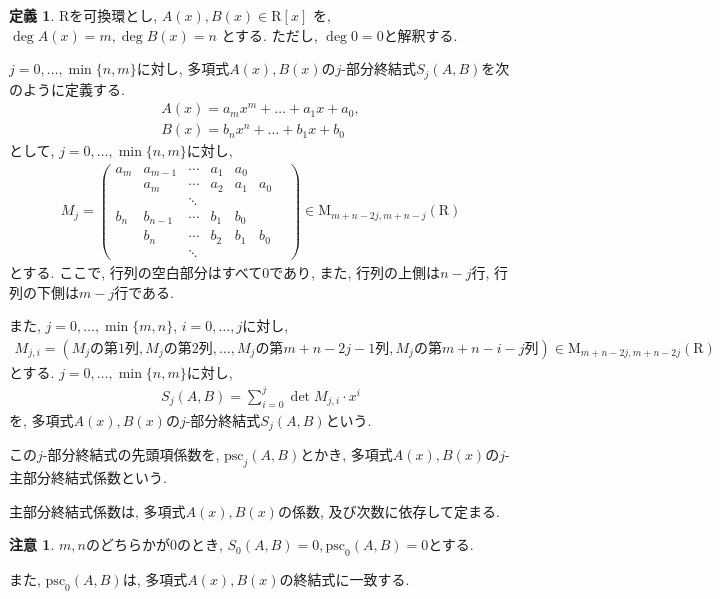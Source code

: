 \documentclass[dvipdfmx,uplatex]{jsarticle}
\newcommand{\psc}{\mathrm{psc}}
\theoremstyle{definition}
\newtheorem{definition}{定義}[section]
\newtheorem{remark}{注意}[section]
\begin{document}
\begin{definition}
$\mathrm{R}$を可換環とし, $A(x), B(x) \in \mathrm{R}[x]$ を, $\deg A(x) = m, \deg B(x) = n$ とする. ただし, $\deg 0 = 0$と解釈する.

$j = 0, \dots, \min\{n, m\}$に対し, 多項式$A(x), B(x)$の$j$-部分終結式$S_j(A, B)$を次のように定義する.
\begin{align*}
A(x) = a_m x^m + \dots + a_1 x + a_0, \\
B(x) = b_n x^n + \dots + b_1 x + b_0 
\end{align*}
として, $j = 0, \dots, \min\{n,m\}$に対し, 
\begin{align*}
M_j = 
\begin{pmatrix}
a_m & a_{m-1} & \cdots & a_1 & a_0 &    &  \\
     &  a_m     & \cdots & a_2 & a_1& a_0 &  \\
     &   & \ddots &  & & \\
b_n & b_{n-1} & \cdots & b_1 & b_0 &    & \\
     &  b_n     & \cdots & b_2 & b_1& b_0 & \\
     &   & \ddots &  & & 
\end{pmatrix}
\in \mathrm{M}_{m+n-2j, m+n-j}(\mathrm{R})
\end{align*}
とする. ここで, 行列の空白部分はすべて0であり, また, 行列の上側は$n-j$行, 行列の下側は$m-j$行である.

また, $j = 0, \dots, \min\{m,n\}$, $i = 0, \dots, j$に対し, 
\begin{align*}
M_{j,i} = (\text{$M_j$の第$1$列}, \text{$M_j$の第$2$列}, \dots ,\text{$M_j$の第$m+n-2j-1$列}, \text{$M_j$の第$m+n-i-j$列})
\in \mathrm{M}_{m+n-2j, m+n-2j}(\mathrm{R})
\end{align*}
とする. $j = 0, \dots, \min\{n, m\}$に対し, 
\begin{align*}
S_j(A, B) = \sum_{i=0}^j \det M_{j, i} \cdot x^i 
\end{align*}
を, 多項式$A(x), B(x)$の$j$-部分終結式$S_j(A, B)$という.

この$j$-部分終結式の先頭項係数を, $\psc_j(A,B)$とかき, 多項式$A(x), B(x)$の$j$-主部分終結式係数という.
\end{definition}


主部分終結式係数は, 多項式$A(x), B(x)$の係数, 及び次数に依存して定まる.

\begin{remark}
$m,n$のどちらかが0のとき, 
$S_0(A,B) = 0, \psc_0(A,B) = 0$とする.

また, $\psc_0(A,B)$は, 多項式$A(x), B(x)$の終結式に一致する.
\end{remark}
\end{document}
